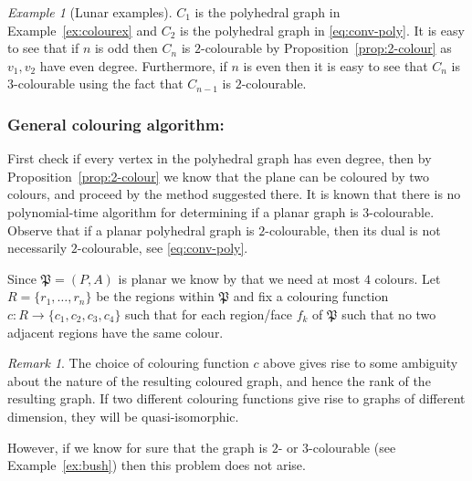 \documentclass[12pt]{amsart}
\theoremstyle{definition}
\theoremstyle{remark}
\newtheorem{rmk}[thm]{Remark}
\newtheorem{example}[thm]{Example}
\numberwithin{equation}{section}
\begin{document}
\begin{example}[Lunar examples]
\begin{minipage}[l]{0.6\textwidth}
\medskip
\hphantom{abd} 
\noindent $C_1$ is the polyhedral graph in Example~\ref{ex:colourex} and $C_2$ is the polyhedral graph in \eqref{eq:conv-poly}. It is easy to see that if $n$ is odd then $C_n$ is $2$-colourable by Proposition~\ref{prop:2-colour} as $v_1 ,v_2$ have even degree. Furthermore, if $n$ is even then it is easy to see that $C_n$ is $3$-colourable using the fact that $C_{n-1}$ is $2$-colourable.
\end{minipage}
\end{example}

\subsubsection*{General colouring algorithm:} \label{sec:coloring-alg}

First check if every vertex in the polyhedral graph has even degree, then by Proposition~\ref{prop:2-colour} we know that the plane can be coloured by two colours, and proceed by the method suggested there. It is known that there is no polynomial-time algorithm for determining if a planar graph is $3$-colourable.
Observe that if a planar polyhedral graph is $2$-colourable, then its dual is not necessarily $2$-colourable, see \eqref{eq:conv-poly}.

Since $\mathfrak{P}= (P,A)$ is planar we know by \cite{AH1,AHK,AH2} that we need at most $4$ colours. Let $R = \{ r_1 , \ldots , r_n \}$ be the regions within $\mathfrak{P}$ and fix a colouring function $c : R \to \{ c_1 , c_2 , c_3 , c_4 \}$ such that for each region/face $f_k$ of $\mathfrak{P}$ such that no two adjacent regions have the same colour.

\begin{rmk}
The choice of colouring function $c$ above gives rise to  some ambiguity about the nature of the resulting coloured graph, and hence the rank of the resulting graph. If two different colouring functions give rise to graphs of different dimension, they will be quasi-isomorphic.

However, if we know for sure that the graph is $2$- or $3$-colourable (see Example~\ref{ex:bush}) then this problem does not arise.
\end{rmk}
\end{document}

